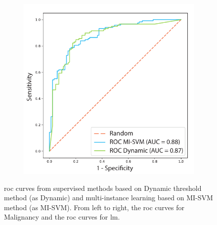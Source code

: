 \documentclass[journal,article,submit,moreauthors,pdftex, applsci]{Definitions/mdpi}
\begin{document}
\begin{figure}[H]
\begin{subfigure}{.45\linewidth}
        \includegraphics[width=\linewidth]{Figures/Result_LMM.pdf}
    \end{subfigure} 
    
    \caption{\ac{roc} curves from supervised methods based on Dynamic threshold method (as Dynamic) and multi-instance learning based on MI-SVM method (as MI-SVM). From left to right, the \ac{roc} curves for Malignancy and the \ac{roc} curves for \ac{lm}.}
    \label{fig:roc_results}
\end{figure}

\end{document}

